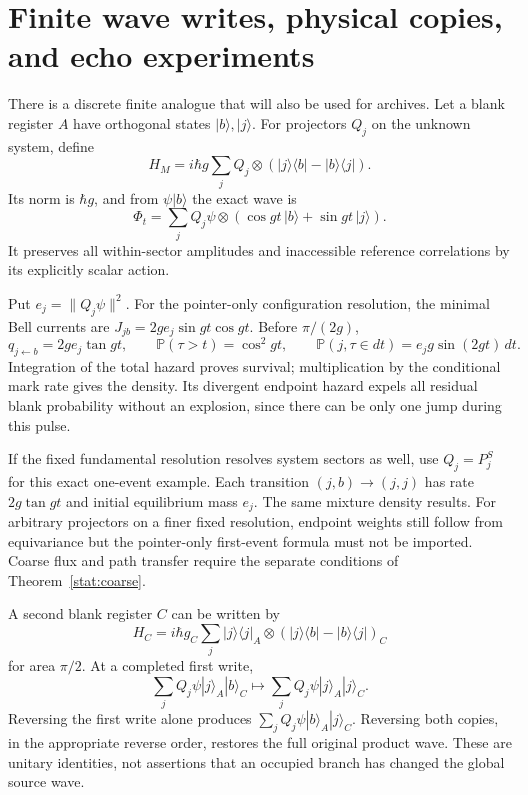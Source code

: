 \documentclass[11pt,oneside,openany]{book}
\theoremstyle{definition}
\theoremstyle{remark}\newtheorem{remark}[theorem]{Remark}
\begin{document}
\section{Finite wave writes, physical copies, and echo experiments}

There is a discrete finite analogue that will also be used for archives.
Let a blank register $A$ have orthogonal states $|b\rangle,|j\rangle$.
For projectors $Q_j$ on the unknown system, define
\begin{equation}
 H_M=i\hbar g\sum_jQ_j\otimes
       (|j\rangle\langle b|-|b\rangle\langle j|).
 \label{cfg:writeH}
\end{equation}
Its norm is $\hbar g$, and from $\psi|b\rangle$ the exact wave is
\begin{equation}
 \Phi_t=\sum_jQ_j\psi\otimes
             (\cos gt\,|b\rangle+\sin gt\,|j\rangle).
 \label{cfg:writewave}
\end{equation}
It preserves all within-sector amplitudes and inaccessible reference
correlations by its explicitly scalar action.

Put $e_j=\|Q_j\psi\|^2$. For the pointer-only configuration resolution,
the minimal Bell currents are $J_{jb}=2ge_j\sin gt\cos gt$.
Before $\pi/(2g)$,
\[
 q_{j\leftarrow b}=2ge_j\tan gt,\qquad
 \mathbb P(\tau>t)=\cos^2gt,\qquad
 \mathbb P(j,\tau\in dt)=e_jg\sin(2gt)\,dt.
\]
Integration of the total hazard proves survival; multiplication by the
conditional mark rate gives the density. Its divergent endpoint hazard
expels all residual blank probability without an explosion, since there
can be only one jump during this pulse.

If the fixed fundamental resolution resolves system sectors as well, use
$Q_j=P_j^S$ for this exact one-event example. Each transition
$(j,b)\to(j,j)$ has rate $2g\tan gt$ and initial equilibrium mass $e_j$.
The same mixture density results. For arbitrary projectors on a finer fixed
resolution, endpoint weights still follow from equivariance but the
pointer-only first-event formula must not be imported. Coarse flux and
path transfer require the separate conditions of
Theorem~\ref{stat:coarse}.

A second blank register $C$ can be written by
\[
 H_C=i\hbar g_C\sum_j|j\rangle\langle j|_A\otimes
           (|j\rangle\langle b|-|b\rangle\langle j|)_C
\]
for area $\pi/2$. At a completed first write,
\[
 \sum_jQ_j\psi|j\rangle_A|b\rangle_C
 \longmapsto\sum_jQ_j\psi|j\rangle_A|j\rangle_C.
\]
Reversing the first write alone produces
$\sum_jQ_j\psi|b\rangle_A|j\rangle_C$. Reversing both copies, in the
appropriate reverse order, restores the full original product wave. These
are unitary identities, not assertions that an occupied branch has changed
the global source wave.
\end{document}
